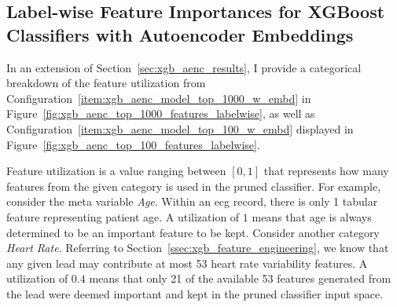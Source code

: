 \documentclass[\main/thesis.tex]{subfiles}
\begin{document}
\begin{appendices}
\chapter{Label-wise Feature Importances for XGBoost Classifiers with Autoencoder Embeddings}

In an extension of Section~\ref{sec:xgb_aenc_results}, I provide a categorical breakdown of the feature utilization from Configuration~\ref{item:xgb_aenc_model_top_1000_w_embd} in Figure~\ref{fig:xgb_aenc_top_1000_features_labelwise}, as well as Configuration~\ref{item:xgb_aenc_model_top_100_w_embd} displayed in Figure~\ref{fig:xgb_aenc_top_100_features_labelwise}.

Feature utilization is a value ranging between $[0, 1]$ that represents how many features from the given category is used in the pruned classifier.
For example, consider the meta variable \emph{Age}.
Within an \gls{ecg} record, there is only 1 tabular feature representing patient age.
A utilization of $1$ means that age is always determined to be an important feature to be kept.
Consider another category \emph{Heart Rate}.
Referring to Section~\ref{ssec:xgb_feature_engineering}, we know that any given lead may contribute at most 53 heart rate variability features.
A utilization of $0.4$ means that only 21 of the available 53 features generated from the lead were deemed important and kept in the pruned classifier input space.


\end{appendices}
\end{document}
